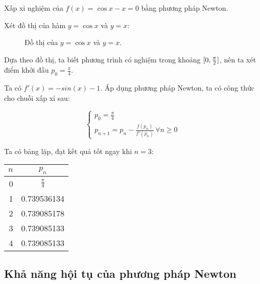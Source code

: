 \documentclass[../../Lectures]{subfiles}
\begin{document}
\begin{exmp}
    Xấp xỉ nghiệm của \(f(x) = \cos{x} - x = 0\) bằng phương pháp Newton.

    Xét đồ thị của hàm \(y = \cos{x}\) và \(y = x\):

    \begin{figure}[H]
        \centering

        \begingroup
            
        \endgroup
        \caption{Đồ thị của \(y = \cos{x}\) và \(y = x\).}
    \end{figure}

    Dựa theo đồ thị, ta biết phương trình có nghiệm trong khoảng
    \(\interval{0}{\frac{\pi}{2}}\), nên ta xét điểm khởi đầu \(p_0 =
    \frac{\pi}{4}\).

    Ta có \(f'(x) = -sin(x) - 1\). Áp dụng phương pháp Newton, ta có công thức
    cho chuỗi xấp xỉ sau:

    \[\begin{cases}
        p_0 = \frac{\pi}{4} \\
        p_{n + 1} = p_n - \frac{f(p_n)}{f'(p_n)} \, \forall n \geq 0
    \end{cases}\]

    Ta có bảng lặp, đạt kết quả tốt ngay khi \(n = 3\):

    \begin{table}[H]
        \centering
        \begin{tabular}{r S[table-format=1.9]}
            \toprule
            {\(n\)}  &     {\(p_n\)}       \\
              &  \(\frac{\pi}{4}\)  \\
                  1  &  0.739536134        \\
                  2  &  0.739085178        \\
                  3  &  0.739085133        \\
                  4  &  0.739085133        \\
            \bottomrule
        \end{tabular}
    \end{table}

\end{exmp}

\subsection{Khả năng hội tụ của phương pháp Newton}
\end{document}
